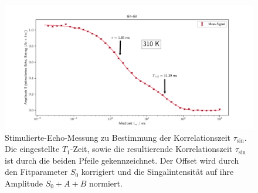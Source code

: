 \begin{figure}[H]
    \centering
    \includegraphics[width=\textwidth]{Auswertung/Para_der_Korrfkt/sin_sin.pdf}
    \caption{Stimulierte-Echo-Messung zu Bestimmung der Korrelationszeit
    $\tau_{\text{sin}}$. Die eingestellte $T_1$-Zeit, sowie die resultierende
    Korrelationszeit $\tau_{\text{sin}}$ ist durch die beiden Pfeile gekennzeichnet.
    Der Offset wird durch den Fitparameter $S_0$ korrigiert und die
    Singalintensität auf ihre Amplitude $S_0+A+B$ normiert.}
    \label{fig:sin}
\end{figure}

